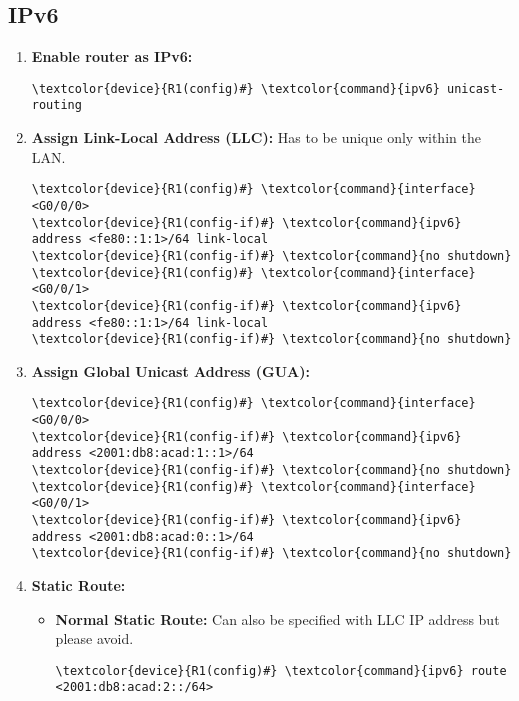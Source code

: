 \documentclass[10pt, a4paper, onecolumn, oneside, titlepage, openany]{book}
\begin{document}
\subsection{IPv6}
\label{Router_IPv6}
\begin{enumerate}
    \item \textbf{Enable router as IPv6:}
\begin{Verbatim}[commandchars=\\\{\}]
\textcolor{device}{R1(config)#} \textcolor{command}{ipv6} unicast-routing
\end{Verbatim}
    \item \textbf{Assign Link-Local Address (LLC):}
\newline Has to be unique only within the LAN.
\begin{Verbatim}[commandchars=\\\{\}]
\textcolor{device}{R1(config)#} \textcolor{command}{interface} <G0/0/0>
\textcolor{device}{R1(config-if)#} \textcolor{command}{ipv6} address <fe80::1:1>/64 link-local
\textcolor{device}{R1(config-if)#} \textcolor{command}{no shutdown}
\textcolor{device}{R1(config)#} \textcolor{command}{interface} <G0/0/1>
\textcolor{device}{R1(config-if)#} \textcolor{command}{ipv6} address <fe80::1:1>/64 link-local
\textcolor{device}{R1(config-if)#} \textcolor{command}{no shutdown}
\end{Verbatim}
    \item \textbf{Assign Global Unicast Address (GUA):}
\begin{Verbatim}[commandchars=\\\{\}]
\textcolor{device}{R1(config)#} \textcolor{command}{interface} <G0/0/0>
\textcolor{device}{R1(config-if)#} \textcolor{command}{ipv6} address <2001:db8:acad:1::1>/64
\textcolor{device}{R1(config-if)#} \textcolor{command}{no shutdown}
\textcolor{device}{R1(config)#} \textcolor{command}{interface} <G0/0/1>
\textcolor{device}{R1(config-if)#} \textcolor{command}{ipv6} address <2001:db8:acad:0::1>/64
\textcolor{device}{R1(config-if)#} \textcolor{command}{no shutdown}
\end{Verbatim}
    \item \textbf{Static Route:}
    \begin{itemize}
        \item \textbf{Normal Static Route:}
\newline Can also be specified with LLC IP address but please avoid.
\begin{Verbatim}[commandchars=\\\{\}]
\textcolor{device}{R1(config)#} \textcolor{command}{ipv6} route <2001:db8:acad:2::/64>

\end{Verbatim}
\end{itemize}
\end{enumerate}
\end{document}
